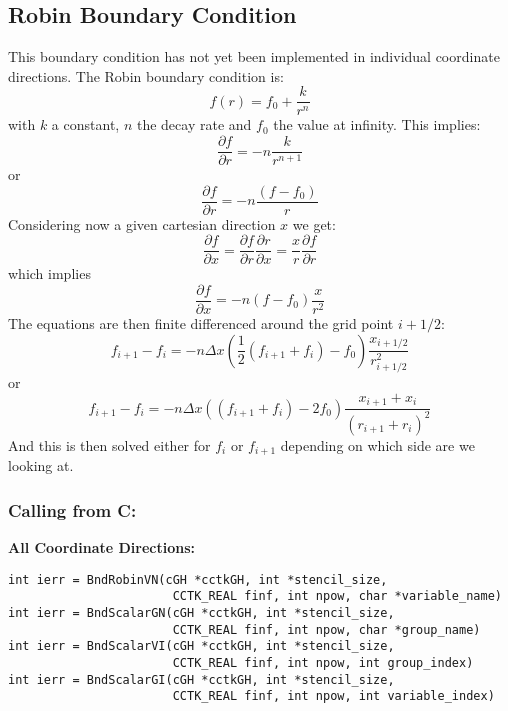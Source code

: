 \documentclass{article}
\begin{document}
\subsection{Robin Boundary Condition}

This boundary condition has not yet been implemented in 
individual coordinate directions.
The Robin boundary condition is:
\begin{equation}
f(r) = f_0 + \frac{k}{r^n}
\end{equation}
with $k$ a constant, $n$ the decay rate and $f_0$ the value at infinity. This implies:
\begin{equation}
\frac{\partial f}{\partial r} =  - n \frac{k}{r^{n+1}}
\end{equation}
or
\begin{equation}
\frac{\partial f}{\partial r} = - n \frac{(f-f_0)}{r}
\end{equation}
Considering now a given cartesian direction $x$  we get:
\begin{equation}
\frac{\partial f}{\partial x} =
\frac{\partial f}{\partial r} 
\frac{\partial r}{\partial x} = \frac{x}{r}\frac{\partial f}{\partial r}
\end{equation}
which implies
\begin{equation}
\frac{\partial f}{\partial x} = - n (f-f_0)\frac{x}{r^2}
\end{equation}
The equations are then finite differenced around the grid point $i+1/2$:
\begin{equation}
f_{i+1} - f_i = - n \Delta x \left( \frac{1}{2}(f_{i+1}+f_i) - f_0\right) \frac{x_{i+1/2}}{r^2_{i+1/2}}
\end{equation}
or
\begin{equation}
f_{i+1}-f_i = -n \Delta x ( (f_{i+1}+f_i)-2 f_0)\frac{x_{i+1}+x_i}{(r_{i+1}+r_i)^2}
\end{equation}
And this is then solved either for $f_i$ or $f_{i+1}$ depending on which side are
we looking at. 


\subsubsection*{Calling from C:}

{\bf All Coordinate Directions:}
\begin{verbatim}
int ierr = BndRobinVN(cGH *cctkGH, int *stencil_size,  
                       CCTK_REAL finf, int npow, char *variable_name)
int ierr = BndScalarGN(cGH *cctkGH, int *stencil_size,  
                       CCTK_REAL finf, int npow, char *group_name)
int ierr = BndScalarVI(cGH *cctkGH, int *stencil_size,  
                       CCTK_REAL finf, int npow, int group_index)
int ierr = BndScalarGI(cGH *cctkGH, int *stencil_size,  
                       CCTK_REAL finf, int npow, int variable_index)
\end{verbatim}
\end{document}
